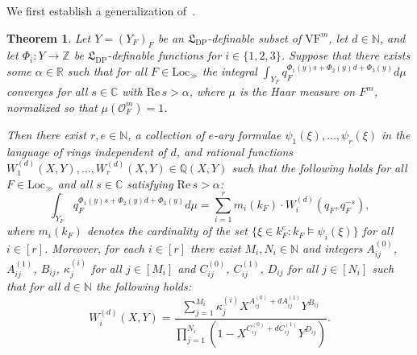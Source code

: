 \documentclass[11pt,a4paper]{amsart}
\theoremstyle{plain}
\newtheorem{thm}{Theorem}[section]
\theoremstyle{remark}
\newcommand{\N}{\mathbb{N}}
\newcommand{\unifmax}{r}
\begin{document}
We first establish a generalization of~\cite[Theorem~B]{BDOP/11}.  
\begin{thm} \label{thm:bdop}
Let $Y = (Y_F)_F$ be an $\mathfrak{L}_{\mathrm{DP}}$-definable subset of $\mathrm{VF}^{m}$,
let $d\in\mathbb{N}$, and let $\Phi_{i}:Y \rightarrow\mathbb{Z}$
be $\mathfrak{L}_{\mathrm{DP}}$-definable functions for $i\in\{1,2,3\}$.
Suppose that there exists some $\alpha \in\mathbb{R}$ such that for all $F \in \mathrm{Loc}_\gg$ the
integral $\int_{Y_{F}}q_{F}^{\Phi_{1}(y)s+\Phi_{2}(y)d+\Phi_{3}(y)}d\mu$
converges for all $s\in\mathbb{C}$ with $\mathrm{Re} \, s>\alpha$, where $\mu$ is the Haar measure on $F^m$, normalized so that $\mu(\mathcal{O}_F^m) = 1$. 

Then there exist $\unifmax, e \in \N$, a collection of $e$-ary formulae $\psi_1(\xi), \dots, \psi_{\unifmax}(\xi)$ in the language of rings independent of $d$, and rational functions
$W_{1}^{(d)}(X,Y),...,W_{\unifmax}^{(d)}(X,Y)\in\mathbb{Q}(X,Y)$ such that the following holds for all $F\in\mathrm{Loc}_{\gg}$
and all $s\in\mathbb{C}$ satisfying $\mathrm{Re} \, s>\alpha$:
\[
\int_{Y_{F}}q_{F}^{\Phi_{1}(y)s+\Phi_{2}(y)d+\Phi_{3}(y)}d\mu=\sum_{i=1}^{\unifmax}m_{i}(k_{F})\cdot W_{i}^{(d)}(q_{F},q_{F}^{-s}),
\]
where $m_{i}(k_{F})$ denotes the cardinality of the set $\{\xi\in k_{F}^{e}:k_{F}\models \psi_{i}(\xi)\}$
for all $i\in[\unifmax]$. Moreover, for each $i \in [\unifmax]$ there exist $M_i, N_i \in \N$ and integers $A_{ij}^{(0)}$, $A_{ij}^{(1)}$, $B_{ij}$, $\kappa^{(i)}_j$ for all $j \in [M_i]$ and $C_{ij}^{(0)}$, $C_{ij}^{(1)}$, $D_{ij}$ for all $j \in [N_i]$ such that for all $d \in \N$ the following holds:
\begin{equation} \label{equ:w.form}
W_{i}^{(d)}(X,Y) = \frac{ \sum_{j = 1}^{M_i} \kappa^{(i)}_j X^{A_{ij}^{(0)} + dA_{ij}^{(1)}} Y^{B_{ij}} }{\prod_{j = 1}^{N_i} (1 - X^{C_{ij}^{(0)} + dC_{ij}^{(1)}} Y^{D_{ij}})}.
\end{equation}
\end{thm}
\end{document}

